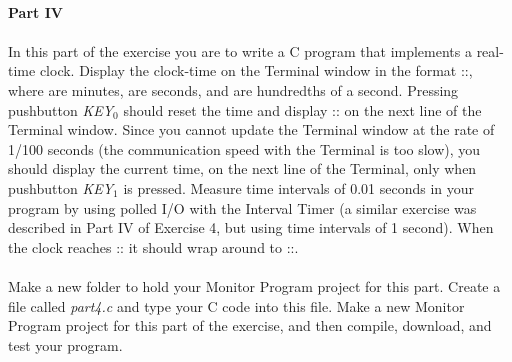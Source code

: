 \documentclass[epsfig,10pt,fullpage]{article}
\begin{document}
~\\
\noindent
{\bf Part IV}
~\\
~\\
\noindent
In this part of the exercise you are to write a C program that implements a real-time
clock. Display the clock-time on the Terminal window in the format ::, 
where  are minutes,  are seconds, and  are hundredths of 
a second. Pressing pushbutton {\it KEY}$_0$ should reset the time and display 
:: on the next line of the Terminal window. Since you cannot update 
the Terminal window at the rate of 1/100 seconds (the communication speed with the Terminal 
is too slow), you should display the current time, on the next line of the Terminal, only when
pushbutton {\it KEY}$_1$ is pressed. Measure time intervals of 0.01 seconds in your program 
by using polled I/O with the Interval Timer (a similar exercise was described in Part IV of Exercise 4, 
but using time intervals of 1 second). When the clock reaches :: it should wrap around 
to ::.
~\\
~\\
\noindent
Make a new folder to hold your Monitor Program project for this part. Create a
file called {\it part4.c} and type your C code into this file.  Make a new Monitor Program 
project for this part of the exercise, and then compile, download, and test your program. 
\end{document}
